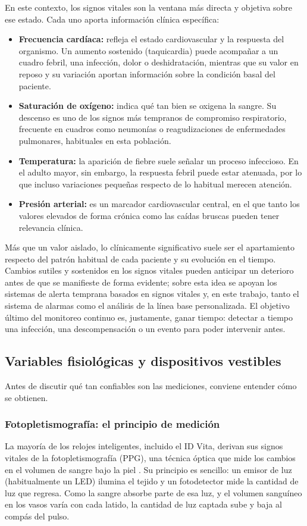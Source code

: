 \documentclass[12pt,a4paper]{article}
\begin{document}
    En este contexto, los signos vitales son la ventana más directa y objetiva sobre ese estado. Cada uno aporta información clínica específica:
    \begin{itemize}
        \item \textbf{Frecuencia cardíaca:} refleja el estado cardiovascular y la respuesta del organismo. Un aumento sostenido (taquicardia) puede acompañar a un cuadro febril, una infección, dolor o deshidratación, mientras que su valor en reposo y su variación aportan información sobre la condición basal del paciente.
        \item \textbf{Saturación de oxígeno:} indica qué tan bien se oxigena la sangre. Su descenso es uno de los signos más tempranos de compromiso respiratorio, frecuente en cuadros como neumonías o reagudizaciones de enfermedades pulmonares, habituales en esta población.
        \item \textbf{Temperatura:} la aparición de fiebre suele señalar un proceso infeccioso. En el adulto mayor, sin embargo, la respuesta febril puede estar atenuada, por lo que incluso variaciones pequeñas respecto de lo habitual merecen atención.
        \item \textbf{Presión arterial:} es un marcador cardiovascular central, en el que tanto los valores elevados de forma crónica como las caídas bruscas pueden tener relevancia clínica.
    \end{itemize}

    Más que un valor aislado, lo clínicamente significativo suele ser el apartamiento respecto del patrón habitual de cada paciente y su evolución en el tiempo. Cambios sutiles y sostenidos en los signos vitales pueden anticipar un deterioro antes de que se manifieste de forma evidente; sobre esta idea se apoyan los sistemas de alerta temprana basados en signos vitales y, en este trabajo, tanto el sistema de alarmas como el análisis de la línea base personalizada. El objetivo último del monitoreo continuo es, justamente, ganar tiempo: detectar a tiempo una infección, una descompensación o un evento para poder intervenir antes.

    \subsection{Variables fisiológicas y dispositivos vestibles}
    Antes de discutir qué tan confiables son las mediciones, conviene entender cómo se obtienen.

    \subsubsection{Fotopletismografía: el principio de medición}
    La mayoría de los relojes inteligentes, incluido el ID Vita, derivan sus signos vitales de la fotopletismografía (PPG), una técnica óptica que mide los cambios en el volumen de sangre bajo la piel \cite{bent2020}. Su principio es sencillo: un emisor de luz (habitualmente un LED) ilumina el tejido y un fotodetector mide la cantidad de luz que regresa. Como la sangre absorbe parte de esa luz, y el volumen sanguíneo en los vasos varía con cada latido, la cantidad de luz captada sube y baja al compás del pulso.
\end{document}
